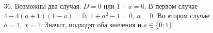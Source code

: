 36. Возможны два случая: $D=0$ или $1-a=0.$ В первом случае $4-4(a+1)(1-a)=0,\ 1+a^2-1=0,\ a=0.$ Во втором случае $a=1,\ x=1.$ Значит, подходят оба значения и $a\in\{0;1\}.$\\
